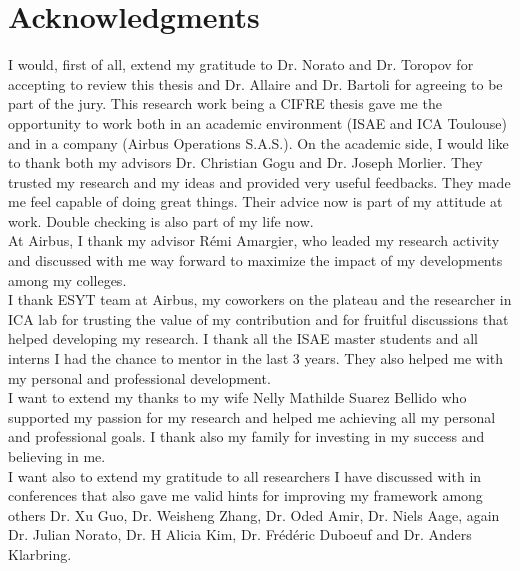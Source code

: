 \chapter*{Acknowledgments}
I would, first of all, extend my gratitude to Dr. Norato and Dr. Toropov for accepting to review this thesis and Dr. Allaire and Dr. Bartoli for agreeing to be part of the jury. 
 This research work being a CIFRE thesis gave me the opportunity to work both in an academic environment (ISAE and ICA Toulouse) and in a company (Airbus Operations S.A.S.). On the academic side, I would like to thank both my advisors Dr. Christian Gogu and Dr. Joseph Morlier. They trusted my research and my ideas and provided very useful feedbacks. They made me feel capable of doing great things. Their advice now is part of my attitude at work. Double checking is also part of my life now.\\
 At Airbus, I thank my advisor Rémi Amargier, who leaded my research activity and discussed with me way forward to maximize the impact of my developments among my colleges.\\
 
 I thank ESYT team at Airbus, my coworkers on the plateau and the researcher in ICA lab for trusting the value of my contribution and for fruitful discussions that helped developing my research. I thank all the ISAE master students and all interns I had the chance to mentor in the last 3 years. They also helped me with my personal and professional development.\\
 
 I want to extend my thanks to my wife Nelly Mathilde Suarez Bellido who supported my passion for my research and helped me achieving all my personal and professional goals. I thank also my family for investing in my success and believing in me.\\
 
 I want also to extend my gratitude to all researchers I have discussed with in conferences that also gave me valid hints for improving my framework among others Dr. Xu Guo, Dr. Weisheng Zhang, Dr. Oded Amir, Dr. Niels Aage, again Dr. Julian Norato, Dr. H Alicia Kim, Dr. Frédéric Duboeuf and Dr. Anders Klarbring. 
 


